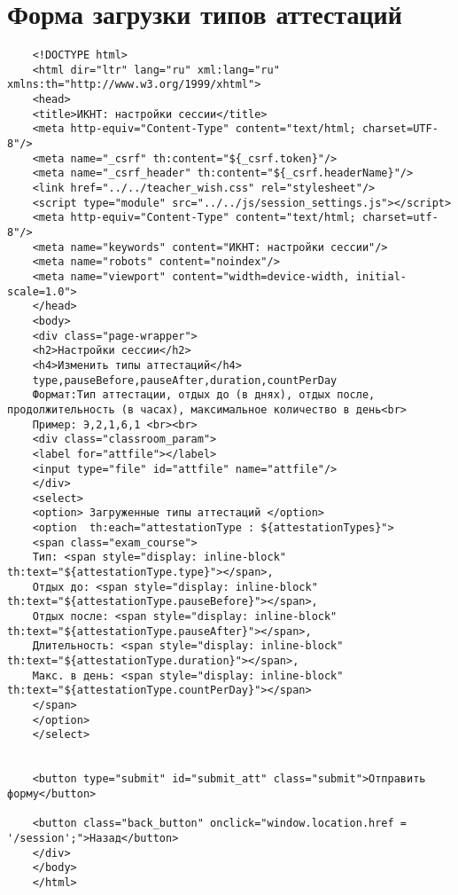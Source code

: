 \chapter{Форма загрузки типов аттестаций}\label{appendix-att}	

\begin{lstlisting}
	<!DOCTYPE html>
	<html dir="ltr" lang="ru" xml:lang="ru" xmlns:th="http://www.w3.org/1999/xhtml">
	<head>
	<title>ИКНТ: настройки сессии</title>
	<meta http-equiv="Content-Type" content="text/html; charset=UTF-8"/>
	<meta name="_csrf" th:content="${_csrf.token}"/>
	<meta name="_csrf_header" th:content="${_csrf.headerName}"/>
	<link href="../../teacher_wish.css" rel="stylesheet"/>
	<script type="module" src="../../js/session_settings.js"></script>
	<meta http-equiv="Content-Type" content="text/html; charset=utf-8"/>
	<meta name="keywords" content="ИКНТ: настройки сессии"/>
	<meta name="robots" content="noindex"/>
	<meta name="viewport" content="width=device-width, initial-scale=1.0">
	</head>
	<body>
	<div class="page-wrapper">
	<h2>Настройки сессии</h2>
	<h4>Изменить типы аттестаций</h4>
	type,pauseBefore,pauseAfter,duration,countPerDay
	Формат:Тип аттестации, отдых до (в днях), отдых после, продолжительность (в часах), максимальное количество в день<br>
	Пример: Э,2,1,6,1 <br><br>
	<div class="classroom_param">
	<label for="attfile"></label>
	<input type="file" id="attfile" name="attfile"/>
	</div>
	<select>
	<option> Загруженные типы аттестаций </option>
	<option  th:each="attestationType : ${attestationTypes}">
	<span class="exam_course">
	Тип: <span style="display: inline-block" th:text="${attestationType.type}"></span>,
	Отдых до: <span style="display: inline-block"  th:text="${attestationType.pauseBefore}"></span>,
	Отдых после: <span style="display: inline-block"  th:text="${attestationType.pauseAfter}"></span>,
	Длительность: <span style="display: inline-block"  th:text="${attestationType.duration}"></span>,
	Макс. в день: <span style="display: inline-block"  th:text="${attestationType.countPerDay}"></span>
	</span>
	</option>
	</select>
	
	
	<button type="submit" id="submit_att" class="submit">Отправить форму</button>
	
	<button class="back_button" onclick="window.location.href = '/session';">Назад</button>
	</div>
	</body>
	</html>
\end{lstlisting}